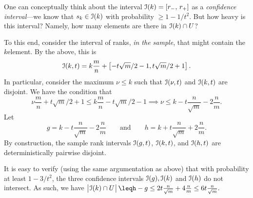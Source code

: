 One can conceptually think about the interval
\begin{math}
    \Interval(k) = [r_-,\, r_+ ]%
\end{math}
as a \emph{confidence interval}---we know that $s_k \in \EuScript{I}(k)$
with probability $\geq 1-1/t^2$. But how heavy is this interval?  Namely,
how many elements are there in $\EuScript{I}(k) \cap U$?

To this end, consider the interval of ranks, \emph{in the sample},
that might contain the $k$\th element. By the above, this is
\begin{equation*}
  \IntervalA(k, t)%
  =%
  k \frac{m}{n} + \pbrc[]{ -t \sqrt{m}/2 -1, t
  \sqrt{m}/2 +1}.
\end{equation*}
In particular, consider the maximum $\nu\leq k$ such that
$\EuScript{I}(\nu, t)$ and $\EuScript{I}(k, t)$ are disjoint. We have the
condition that
\begin{equation*}
    \nu \frac{m}{n}  +t
    \sqrt{m}/2 +1 \leq k \frac{m}{n} -t\sqrt{m}/2 -1%
    \implies%
    \nu  \leq k  - t \frac{n}{\sqrt{m}} -2\frac{n}{m}.
\end{equation*}
Let
\begin{equation*}
    g= k - t \frac{n}{\sqrt{m}} -2\frac{n}{m}
    \qquad\text{and}\qquad
    h = k + t \frac{n}{\sqrt{m}} +2\frac{n}{m}.
\end{equation*}
By construction, the sample rank intervals $\EuScript{I}(g, t)$,
$\EuScript{I}(k, t)$, and $\EuScript{I}(h, t)$ are deterministically pairwise
disjoint.

It is easy to verify (using the same argumentation as above) that with
probability at least $1-3/t^2$, the three confidence intervals
$\EuScript{I}(g), \EuScript{I}(k)$ and $\EuScript{I}(h)$ do not intersect. As
such, we have
\begin{math}
    \cardin{\big.\ts \Interval(k) \cap U\ts}%
    \leq%
    h-g%
    \leq%
    2 t \frac{n}{\sqrt{m}} + 4 \frac{n}{m} \leq 6 t \frac{n}{\sqrt{m}}.
\end{math}










